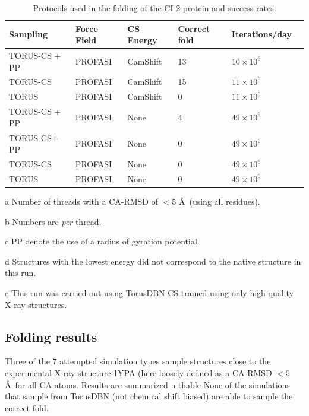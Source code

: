 \begin{table}[h]
    \caption{Protocols used in the folding of the CI-2 protein and success rates.}
    \begin{center}
    \begin{threeparttable}
    \begin{tabular}{l l l l l l}
        Sampling        & Force Field   & CS Energy         & Correct fold\tnote{a} & Iterations/day\tnote{b}\\\hline
          TORUS-CS + PP\tnote{c} & PROFASI       & CamShift          & 13            & $10 \times 10^6$ \\
          TORUS-CS      & PROFASI       & CamShift          & 15            & $11 \times 10^6$\\
          TORUS         & PROFASI       & CamShift          & 0             & $11 \times 10^6$\\
 TORUS-CS + PP\tnote{c} & PROFASI       & None              & 4\tnote{d}      & $49 \times 10^6$\\
 TORUS-CS\tnote{e}+ PP\tnote{c} & PROFASI      & None              & 0             & $49 \times 10^6$\\
          TORUS-CS      & PROFASI       & None              & 0             & $49 \times 10^6$\\
          TORUS         & PROFASI       & None              & 0             & $49 \times 10^6$\\
    \end{tabular}
    \begin{tablenotes}
        \item[a] Number of threads with a CA-RMSD of $<5$ \AA\ (using all residues).\\
        \item[b] Numbers are \textit{per} thread.
        \item[c] PP denote the use of a radius of gyration potential.\\
        \item[d] Structures with the lowest energy did not correspond to the native structure in this run.\\
        \item[e] This run was carried out using TorusDBN-CS trained using only high-quality X-ray structures.
    \end{tablenotes}
    \end{threeparttable}
    \end{center}
    \label{tab:ci2}
\end{table}
\subsection{Folding results}
Three of the 7 attempted simulation types sample structures close to the experimental X-ray structure 1YPA (here loosely defined as a CA-RMSD $<5$ \AA\ for all CA atoms. Results are summarized n thable
None of the simulations that sample from TorusDBN (not chemical shift biased) are able to sample the correct fold.

